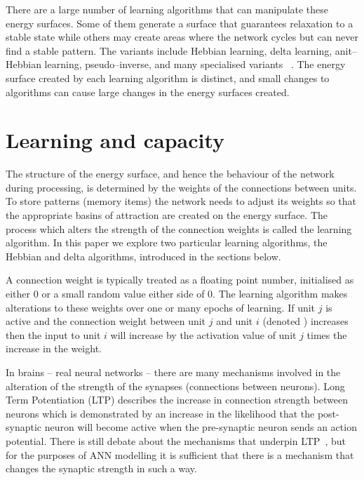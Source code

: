 There are a large number of learning algorithms that can manipulate these energy surfaces.  Some of them generate a surface that guarantees relaxation to a stable state while others may create areas where the network cycles but can never find a stable pattern.  The variants include Hebbian learning, delta learning, anit--Hebbian learning, pseudo--inverse, and many specialised variants ~\citep{Amit95,Storkey1997,Athithan02}.  The energy surface created by each learning algorithm is distinct, and small changes to algorithms can cause large changes in the energy surfaces created.


\newpage{}%
\section{Learning and capacity} 
\label{sec:LearnCap}

The structure of the energy surface, and hence the behaviour of the network during processing, is determined by the weights of the connections between units.  To store patterns (memory items) the network needs to adjust its weights so that the appropriate basins of attraction are created on the energy surface. The process which alters the strength of the connection weights is called the learning algorithm.  In this paper we explore two particular learning algorithms, the Hebbian and delta algorithms, introduced in the sections below.

A connection weight is typically treated as a floating point number, initialised as either $0$ or a small random value either side of $0$.  The learning algorithm makes alterations to these weights over one or many epochs of learning.  If unit $j$ is active and the connection weight between unit $j$ and unit $i$ (denoted ) increases then the input to unit $i$ will increase by the activation value of unit $j$ times the increase in the weight.

In brains -- real neural networks -- there are many mechanisms involved in the alteration of the strength of the synapses (connections between neurons).  Long Term Potentiation (LTP) describes the increase in connection strength between neurons which is demonstrated by an increase in the likelihood that the post-synaptic neuron will become active when the pre-synaptic neuron sends an action potential.  There is still debate about the mechanisms that underpin LTP~\citep{Malenka1999,Palmer2004}, but for the purposes of ANN modelling it is sufficient that there is a mechanism that changes the synaptic strength in such a way.

